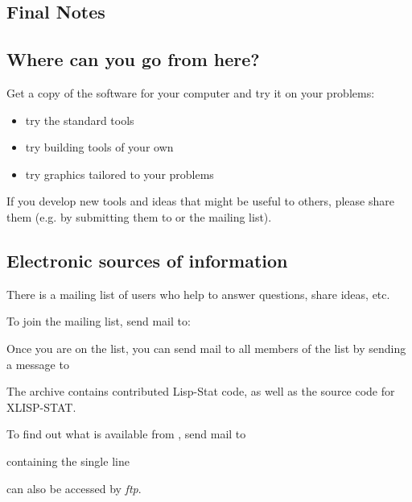 \begin{slide}{}
\chapter{Final Notes}
\end{slide}

\begin{slide}{}
\section{Where can you go from here?}
Get a copy of the software for your computer and try it on your problems:
\begin{itemize}
\item try the standard tools
\item try building tools of your own
\item try graphics tailored to your problems
\end{itemize}
If you develop new tools and ideas that might be useful to others,
please share them (e.g. by submitting them to  or the
 mailing list).
\end{slide}

\begin{slide}{}
\section{Electronic sources of information}
There is a mailing list of users who help to answer questions, share
ideas, etc.

To join the mailing list, send mail to:
\begin{center}
\Large
{}
\end{center}
Once you are on the list, you can send mail to all members of the list
by sending a message to
\begin{center}
\end{center}
The  archive contains contributed Lisp-Stat code, as
well as the source code for XLISP-STAT.

To find out what is available from , send mail to
\begin{center}
\end{center}
containing the single line
\begin{center}
\end{center}
 can also be accessed by {\em ftp}.
\end{slide}

